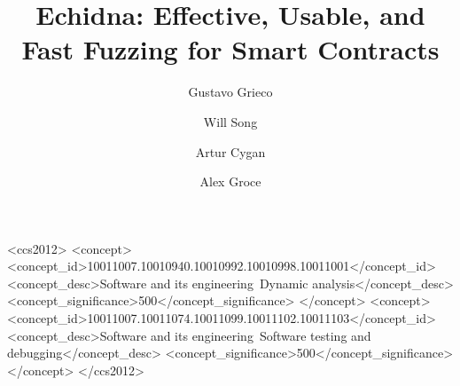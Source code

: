 \documentclass[sigconf]{acmart}
\author{Gustavo Grieco}
\author{Will Song}
\author{Artur Cygan}
\affiliation{\institution{Trail of Bits}}
\author{Alex Groce}
\affiliation{\institution{Northern Arizona University}}
\begin{document}
\title{Echidna: Effective, Usable, and Fast Fuzzing for Smart Contracts}

\begin{CCSXML}
<ccs2012>
<concept>
<concept_id>10011007.10010940.10010992.10010998.10011001</concept_id>
<concept_desc>Software and its engineering~Dynamic analysis</concept_desc>
<concept_significance>500</concept_significance>
</concept>
<concept>
<concept_id>10011007.10011074.10011099.10011102.10011103</concept_id>
<concept_desc>Software and its engineering~Software testing and debugging</concept_desc>
<concept_significance>500</concept_significance>
</concept>
</ccs2012>
\end{CCSXML}




\begin{abstract}

\end{abstract}

\maketitle 










\end{document}
